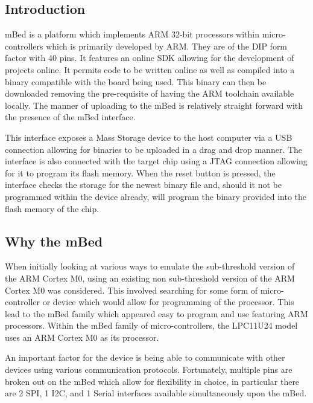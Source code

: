 

\subsection{Introduction}

mBed is a platform which implements ARM 32-bit processors within micro-controllers which is primarily developed by ARM. They are of the DIP form factor with 40 pins. It features an online SDK allowing for the development of projects online. It permits code to be written online as well as compiled into a binary compatible with the board being used. This binary can then be downloaded removing the pre-requisite of having the ARM toolchain available locally. The manner of uploading to the mBed is relatively straight forward with the presence of the mBed interface. \cite{mbed_website}

This interface exposes a Mass Storage device to the host computer via a USB connection allowing for binaries to be uploaded in a drag and drop manner. The interface is also connected with the target chip using a JTAG connection allowing for it to program its flash memory. When the reset button is pressed, the interface checks the storage for the newest binary file and, should it not be programmed within the device already, will program the binary provided into the flash memory of the chip. \cite{mbed_website}

\subsection{Why the mBed}

When initially looking at various ways to emulate the sub-threshold version of the ARM Cortex M0, using an existing non sub-threshold version of the ARM Cortex M0 was considered. This involved searching for some form of micro-controller or device which would allow for programming of the processor. This lead to the mBed family which appeared easy to program and use featuring ARM processors. Within the mBed family of micro-controllers, the LPC11U24 model uses an ARM Cortex M0 as its processor.

An important factor for the device is being able to communicate with other devices using various communication protocols. Fortunately, multiple pins are broken out on the mBed which allow for flexibility in choice, in particular there are 2 SPI, 1 I2C, and 1 Serial interfaces available simultaneously upon the mBed. \cite{mbed_website} 

